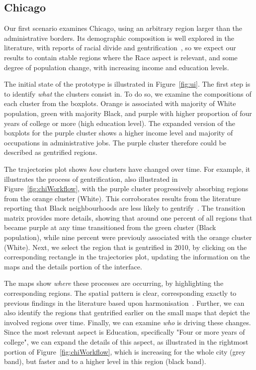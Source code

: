 \subsection{Chicago}
Our first scenario examines Chicago, using an arbitrary region larger than the
administrative borders. Its demographic composition is well explored in the
literature, with reports of racial divide and
gentrification~\citep{Delmelle2016,Delmelle2017,Hwang2014}, so we expect our
results to contain stable regions where the Race aspect is relevant, and some
degree of population change, with increasing income and education levels. 


The initial state of the prototype is illustrated in Figure~\ref{fig:ui}. The
first step is to identify \textit{what} the clusters consist in. To do so, we
examine the compositions of each cluster from the boxplots. Orange is associated
with majority of White population, green with majority Black, and purple with
higher proportion of four years of college or more (high education level). The
expanded version of the boxplots for the purple cluster shows a higher income
level and majority of occupations in administrative jobs. The purple cluster
therefore could be described as gentrified regions.


The trajectories plot shows \textit{how} clusters have changed over time.  For
example, it illustrates the process of gentrification, also illustrated in
Figure~\ref{fig:chiWorkflow}, with the purple cluster progressively absorbing
regions from the orange cluster (White). This corroborates results from the
literature reporting that Black neighbourhoods are less likely to
gentrify~\citep{Hwang2014}. The transition matrix provides more details, showing
that around one percent of all regions that became purple at any time
transitioned from the green cluster (Black population), while nine percent were
previouly associated with the orange cluster (White). Next, we select the region
that is gentrified in 2010, by clicking on the corresponding rectangle in the
trajectories plot, updating the information on the maps and the details portion
of the interface.

The maps show \textit{where} these processes are occurring, by highlighting the
corresponding regions. The spatial pattern is clear, corresponding exactly to
previous findings in the literature based upon harmonisation~\citep{Hwang2014}.
Further, we can also identify the regions that gentrified earlier on the small
maps that depict the involved regions over time. Finally, we can examine
\textit{who} is driving these changes. Since the most relevant aspect is
Education, specifically "Four or more years of college", we can expand the
details of this aspect, as illustrated in the rightmost portion of
Figure~\ref{fig:chiWorkflow}, which is increasing for the whole city (grey
band), but faster and to a higher level in this region (black band).

